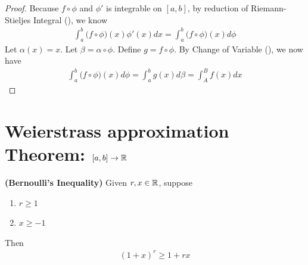 \documentclass{report}
\begin{document}
\begin{proof}
Because $f\circ \phi$ and  $\phi'$ is integrable on $[a,b]$, by reduction of Riemann-Stieljes Integral (), we know 
\begin{align*}
\int_a^b \big(f\circ \phi)(x)  \phi'(x)dx= \int_a^b \big(f\circ \phi \big)(x)d \phi
\end{align*}
Let $\alpha (x)=x$. Let $\beta = \alpha \circ  \phi$. Define $g=f \circ  \phi $. By Change of Variable (), we now have  
\begin{align*}
\int_a^b \big(f \circ  \phi \big)(x)d \phi =\int_a^b g(x)d\beta = \int_A^B f(x)dx
\end{align*}
\end{proof}
\section{Weierstrass approximation Theorem: $[a,b]\rightarrow \mathbb{R}$}
\begin{theorem}
\label{Bernoulli's Inequality}
\textbf{(Bernoulli's Inequality)} Given $r,x \in\mathbb{R}$, suppose 
\begin{enumerate}[label=(\alph*)]
  \item $r\geq 1$ 
  \item $x\geq -1$
\end{enumerate}
Then
\begin{align*}
  (1+x)^r\geq 1+rx
\end{align*}
\end{theorem}
\end{document}
